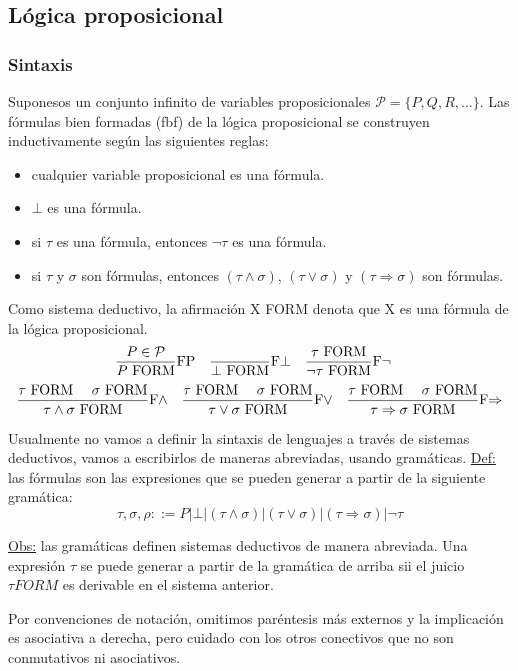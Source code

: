 \documentclass[12pt]{extarticle}
\def\definicion{\newline\underline{Def:} }
\def\observacion{\underline{Obs:} }
\def\ssspace{\space\space\space}
\newcommand\Regla[3]{\frac{\text{#3}}{\text{#2}} \text{#1}}
\begin{document}
\subsection{Lógica proposicional}

\subsubsection{Sintaxis}
Suponesos un conjunto infinito de variables proposicionales $\mathcal{P} = \{P, Q, R, ...\}$. Las fórmulas bien formadas (fbf) de la lógica proposicional se construyen inductivamente según las siguientes reglas:

\begin{itemize}
\itemsep-0.35em 
\item cualquier variable proposicional es una fórmula.
\item $\bot$ es una fórmula.
\item si $\tau$ es una fórmula, entonces $\neg\tau$ es una fórmula.
\item si $\tau$ y $\sigma$ son fórmulas, entonces $(\tau \land \sigma)$, $(\tau \lor \sigma)$ y $(\tau \Rightarrow \sigma)$ son fórmulas.
\end{itemize}
Como sistema deductivo, la afirmación X FORM denota que X es una fórmula de la lógica proposicional.
$$
\Regla{FP\ssspace}{$P$ FORM}{$P \in \mathcal{P}$}
\Regla{F$\bot$\ssspace}{$\bot$ FORM}{}
\Regla{F$\neg$\ssspace}{$\neg \tau$ FORM}{$\tau$ FORM}
$$
$$
\Regla{F$\land$\ssspace}{$\tau \land \sigma$ FORM}{$\tau$ FORM \ssspace $\sigma$ FORM}
\Regla{F$\lor$\ssspace}{$\tau \lor \sigma$ FORM}{$\tau$ FORM \ssspace $\sigma$ FORM}
\Regla{F$\Rightarrow$}{$\tau \Rightarrow \sigma$ FORM}{$\tau$ FORM \ssspace $\sigma$ FORM}
$$

Usualmente no vamos a definir la sintaxis de lenguajes a través de sistemas deductivos, vamos a escribirlos de maneras abreviadas, usando gramáticas.
\definicion las fórmulas son las expresiones que se pueden generar a partir de la siguiente gramática:
$$ \tau,\sigma,\rho ::= P | \bot | (\tau \land \sigma) | (\tau \lor \sigma) | (\tau \Rightarrow \sigma) | \neg \tau $$

\observacion las gramáticas definen sistemas deductivos de manera abreviada. Una expresión $\tau$ se puede generar a partir de la gramática de arriba sii el juicio $\tau FORM $ es derivable en el sistema anterior.

Por convenciones de notación, omitimos paréntesis más externos y la implicación es asociativa a derecha, pero cuidado con los otros conectivos que no son conmutativos ni asociativos.
\end{document}
